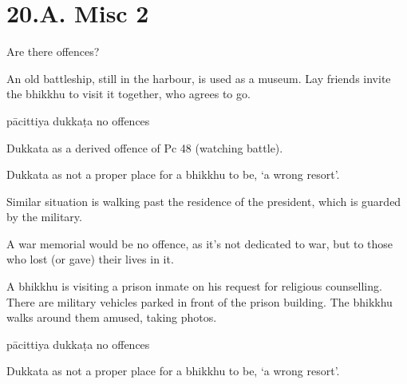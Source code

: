 \chapter{20.A. Misc 2}
\renewcommand*{\theChapterTitle}{20.A. Misc 2}

\begin{exam}{\autoExamName}

  \begin{problem*}

    Are there offences?

    \begin{parts}

      \item An old battleship, still in the harbour, is used as a museum. Lay
      friends invite the bhikkhu to visit it together, who agrees to go.

      \bigskip

      \begin{answers}{3}
        \bChoices
         pācittiya\eAns
         dukkaṭa\eAns
         no offences\eAns
        \eChoices
      \end{answers}

      \begin{solution}
        Dukkata as a derived offence of Pc 48 (watching battle).

        Dukkata as not a proper place for a bhikkhu to be, `a wrong resort'.

        Similar situation is walking past the residence of the president, which is guarded by the military.

        A war memorial would be no offence, as it's not dedicated to war, but to those who lost (or gave) their lives in it.
      \end{solution}

      \bigskip

      \item A bhikkhu is visiting a prison inmate on his request for religious
      counselling. There are military vehicles parked in front of the prison
      building. The bhikkhu walks around them amused, taking photos.

      \bigskip

      \begin{answers}{3}
        \bChoices
         pācittiya\eAns
         dukkaṭa\eAns
         no offences\eAns
        \eChoices
      \end{answers}

      \begin{solution}
        Dukkata as not a proper place for a bhikkhu to be, `a wrong resort'.
      \end{solution}


\end{parts}
\end{problem*}
\end{exam}
